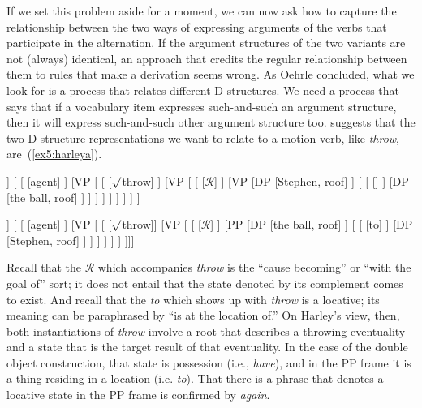 If we set this problem aside for a moment, we can now ask how to capture the relationship between the two ways of expressing arguments of the verbs that participate in the alternation. If the argument structures of the two variants are not (always) identical, an approach that credits the regular relationship between them to rules that make a derivation seems wrong. As Oehrle concluded, what we look for is a process that relates different D-structures. We need a process that says that if a vocabulary item expresses such-and-such an argument structure, then it will express such-and-such other argument structure too. \citet{Harley:2002a} suggests that the two D-structure representations we want to relate to a motion verb, like \emph{throw}, are~(\ref{ex5:harleya}).%
%
%
%
\begin{fullwidth}
\medskip
\begin{exe}
	\raggedright
	\ex \label{ex5:harleya} 
	\small
	\begin{forest}
	[vP
		[DP [Ania, roof]]
		[ 
			[ ]
			[VP [
				[ [$\surd$throw] ]
				[VP [
					[ [$\mathcal{R}$] ]
					[VP
						[DP [Stephen, roof] ]
						[
							[ [] ]
							[DP [the ball, roof] ]
						 ]
					 ]
				] ]
			] ]
		]
	]
	\end{forest}
	\hspace*{-22pt}
	\begin{forest}
	[vP
		[DP [Ania, roof]]
		[\ibar{v} 
			[ ]
			[VP [\ibar{V}
			[ [$\surd$throw]]
			[VP [\ibar{V}
				[ [$\mathcal{R}$] ]
				[PP
					[DP [the ball, roof] ]
					[\ibar{P}
						[\obar{P} [to] ]
						[DP [Stephen, roof] ]
					 ]
				 ]
			] ]
		]
	]]]
	\end{forest}
\end{exe}
\medskip
\end{fullwidth}
Recall that the $\mathcal{R}$ which accompanies \emph{throw} is the ``cause becoming'' or ``with the goal of'' sort; it does not entail that the state denoted by its complement comes to exist. And recall that the \emph{to} which shows up with \emph{throw} is a locative; its meaning can be paraphrased by ``is at the location of.'' On Harley's view, then, both instantiations of \emph{throw} involve a root that describes a throwing eventuality and a state that is the target result of that eventuality. In the case of the double object construction, that state is possession (i.e., \emph{have}), and in the PP frame it is a thing residing in a location (i.e. \emph{to}). That there is a phrase that denotes a locative state in the PP frame is confirmed by \emph{again}.
